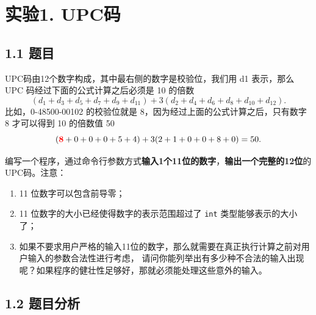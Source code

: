 \vspace{-3cm}\chapter{实验1. UPC码}

\section{1.1 题目}
UPC码由12个数字构成，其中最右侧的数字是校验位，我们用 d1 表示，那么 UPC 码经过下面的公式计算之后必须是 10 的倍数
$$
\left(d_{1}+d_{3}+d_{5}+d_{7}+d_{9}+d_{11}\right)+3\left(d_{2}+d_{4}+d_{6}+d_{8}+d_{10}+d_{12}\right).
$$
比如，0-48500-00102 的校验位就是 8，因为经过上面的公式计算之后，只有数字 8 才可以得到 10 的倍数值 50
$$
(\mathbf{\color{red}8}+0+0+0+5+4)+3(2+1+0+0+8+0)=50.
$$

编写一个程序，通过命令行参数方式\textbf{输入1个11位的数字}，\textbf{输出一个完整的12位}的UPC码。注意：
\begin{enumerate}
    \item 11 位数字可以包含前导零；
    \item 11 位数字的大小已经使得数字的表示范围超过了 \lstinline{int} 类型能够表示的大小了；
    \item 如果不要求用户严格的输入11位的数字，那么就需要在真正执行计算之前对用户输入的参数合法性进行考虑，
        请问你能列举出有多少种不合法的输入出现呢？如果程序的健壮性足够好，那就必须能处理这些意外的输入。
\end{enumerate}

\section{1.2 题目分析}

